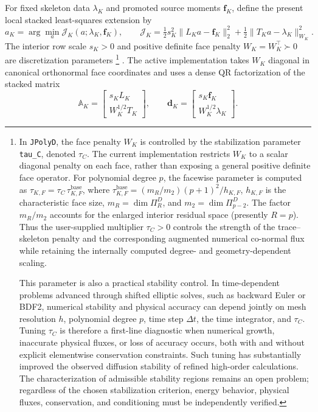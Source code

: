 \documentclass[11pt]{article}
\begin{document}
For fixed skeleton data $\lambda_K$ and promoted source moments
$\bm f_K$, define the present local stacked least-squares extension
by
\begin{equation}\label{eq:full_leaf_min}
 \boxed{\displaystyle
 a_K=\arg\min_a\mathcal J_K(a;\lambda_K,\bm f_K),\qquad
 \mathcal J_K=
 \tfrac12s_K^2\|L_Ka-\bm f_K\|_2^2
 +\tfrac12\|T_Ka-\lambda_K\|_{W_K}^2.}
\end{equation}
The interior row scale $s_K>0$ and positive definite face penalty
$W_K=W_K^\top\succ0$ are discretization parameters
\footnote{%
	In \texttt{JPolyD}, the face penalty $W_K$ is controlled by
	the stabilization parameter \texttt{tau\_C}, denoted $\tau_C$.
	The current implementation restricts $W_K$ to a scalar diagonal
	penalty on each face, rather than exposing a general positive
	definite face operator. For polynomial degree $p$, the
	facewise parameter is computed as
	$\tau_{K,F}=\tau_C\,\tau_{K,F}^{\mathrm{base}}$, where
	$\tau_{K,F}^{\mathrm{base}}
	=(m_R/m_2)(p+1)^2/h_{K,F}$,
	$h_{K,F}$ is the characteristic face size,
	$m_R=\dim\Pi_R^D$, and $m_2=\dim\Pi_{p-2}^D$.
	The factor $m_R/m_2$ accounts for the enlarged interior
	residual space (presently $R=p$). Thus the user-supplied
	multiplier $\tau_C>0$ controls the strength of the
	trace--skeleton penalty and the corresponding augmented
	numerical co-normal flux while retaining the internally
	computed degree- and geometry-dependent scaling.
	
	This parameter is also a practical stability control.
	In time-dependent problems advanced through shifted elliptic
	solves, such as backward Euler or BDF2, numerical stability
	and physical accuracy can depend jointly on mesh resolution
	$h$, polynomial degree $p$, time step $\Delta t$, the time
	integrator, and $\tau_C$. Tuning $\tau_C$ is therefore a
	first-line diagnostic when numerical growth, inaccurate
	physical fluxes, or loss of accuracy occurs, both with and
	without explicit elementwise conservation constraints.
	Such tuning has substantially improved the observed
	diffusion stability of refined high-order calculations.
	The characterization of admissible stability regions remains
	an open problem; regardless of the chosen stabilization
	criterion, energy behavior, physical fluxes, conservation,
	and conditioning must be independently verified.%
}
.  The active
implementation takes $W_K$ diagonal in canonical orthonormal face
coordinates and uses a dense QR factorization of the stacked matrix
\begin{equation}\label{eq:full_leaf_stack}
 \mathbb A_K=
 \begin{bmatrix}s_KL_K\\W_K^{1/2}T_K\end{bmatrix},
 \qquad
 \bm d_K=
 \begin{bmatrix}s_K\bm f_K\\W_K^{1/2}\lambda_K\end{bmatrix}.
\end{equation}
\end{document}
